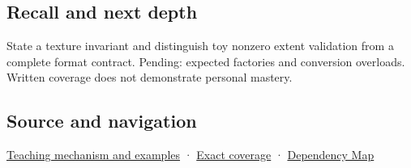 \subsection{Recall and next depth}\label{appendix-7f8ec83d0886-recall-and-next-depth}

State a texture invariant and distinguish toy nonzero extent validation from a complete format contract. Pending: expected factories and conversion overloads. Written coverage does not demonstrate personal mastery.

\subsection{Source and navigation}\label{appendix-7f8ec83d0886-source-and-navigation}

\hyperref[01-foundations-i-ch003-construction-establishes-a-usable-state]{Teaching mechanism and examples} · \hyperref[appendix-fd090d982a15-m009---parts-127-147]{Exact coverage} · \hyperref[appendix-4ad47bdd269a]{Dependency Map}
